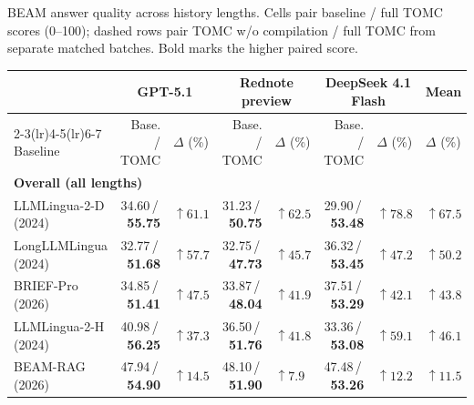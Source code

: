 \documentclass[border=10pt]{standalone}
\begin{document}
\begin{minipage}{5.5in}

BEAM answer quality across history lengths. Cells pair baseline / full TOMC scores (0--100); dashed rows pair TOMC w/o compilation / full TOMC from separate matched batches. Bold marks the higher paired score.\par\medskip
{\small\setlength{\tabcolsep}{1pt}\renewcommand{\arraystretch}{1.12}
\begin{tabular*}{\linewidth}{@{\extracolsep{\fill}}lrlrlrll@{}}
\toprule
 & \multicolumn{2}{c}{GPT-5.1} & \multicolumn{2}{c}{Rednote preview} & \multicolumn{2}{c}{DeepSeek 4.1 Flash} & Mean \\
\cmidrule(lr){2-3}\cmidrule(lr){4-5}\cmidrule(lr){6-7}
Baseline & {\fontsize{8}{9}\selectfont Base. / TOMC} & $\Delta$ (\%) & {\fontsize{8}{9}\selectfont Base. / TOMC} & $\Delta$ (\%) & {\fontsize{8}{9}\selectfont Base. / TOMC} & $\Delta$ (\%) & $\Delta$ (\%) \\
\midrule
\multicolumn{8}{l}{\textbf{Overall (all lengths)}}\\
LLMLingua-2-D (2024) & 34.60\,/\,\textbf{55.75} & \textcolor{beamgain}{$\uparrow61.1$} & 31.23\,/\,\textbf{50.75} & \textcolor{beamgain}{$\uparrow62.5$} & 29.90\,/\,\textbf{53.48} & \textcolor{beamgain}{$\uparrow78.8$} & \textcolor{beamgain}{$\uparrow67.5$} \\
LongLLMLingua (2024) & 32.77\,/\,\textbf{51.68} & \textcolor{beamgain}{$\uparrow57.7$} & 32.75\,/\,\textbf{47.73} & \textcolor{beamgain}{$\uparrow45.7$} & 36.32\,/\,\textbf{53.45} & \textcolor{beamgain}{$\uparrow47.2$} & \textcolor{beamgain}{$\uparrow50.2$} \\
BRIEF-Pro (2026) & 34.85\,/\,\textbf{51.41} & \textcolor{beamgain}{$\uparrow47.5$} & 33.87\,/\,\textbf{48.04} & \textcolor{beamgain}{$\uparrow41.9$} & 37.51\,/\,\textbf{53.29} & \textcolor{beamgain}{$\uparrow42.1$} & \textcolor{beamgain}{$\uparrow43.8$} \\
LLMLingua-2-H (2024) & 40.98\,/\,\textbf{56.25} & \textcolor{beamgain}{$\uparrow37.3$} & 36.50\,/\,\textbf{51.76} & \textcolor{beamgain}{$\uparrow41.8$} & 33.36\,/\,\textbf{53.08} & \textcolor{beamgain}{$\uparrow59.1$} & \textcolor{beamgain}{$\uparrow46.1$} \\
BEAM-RAG (2026) & 47.94\,/\,\textbf{54.90} & \textcolor{beamgain}{$\uparrow14.5$} & 48.10\,/\,\textbf{51.90} & \textcolor{beamgain}{$\uparrow7.9$} & 47.48\,/\,\textbf{53.26} & \textcolor{beamgain}{$\uparrow12.2$} & \textcolor{beamgain}{$\uparrow11.5$} \\

\end{tabular*}}
\end{minipage}
\end{document}
